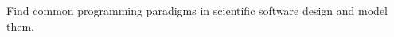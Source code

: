 \documentclass[../../proposal.tex]{subfiles}
\begin{document}
Find common programming paradigms in scientific software design and model them.
\end{document}
